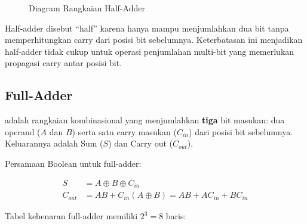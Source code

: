 \begin{figure}[htbp]
\centering
{}
\caption{Diagram Rangkaian Half-Adder}
\label{fig:half-adder}
\end{figure}

Half-adder disebut ``half'' karena hanya mampu menjumlahkan dua bit tanpa memperhitungkan carry dari posisi bit sebelumnya. Keterbatasan ini menjadikan half-adder tidak cukup untuk operasi penjumlahan multi-bit yang memerlukan propagasi carry antar posisi bit.

\subsection{Full-Adder}

\begin{definisi}
 adalah rangkaian kombinasional yang menjumlahkan \textbf{tiga} bit masukan: dua operand ($A$ dan $B$) serta satu carry masukan ($C_{in}$) dari posisi bit sebelumnya. Keluarannya adalah Sum ($S$) dan Carry out ($C_{out}$).
\end{definisi}

Persamaan Boolean untuk full-adder:

\begin{align*}
S &= A \oplus B \oplus C_{in} \\
C_{out} &= AB + C_{in}(A \oplus B) = AB + AC_{in} + BC_{in}
\end{align*}

Tabel kebenaran full-adder memiliki $2^3 = 8$ baris:

